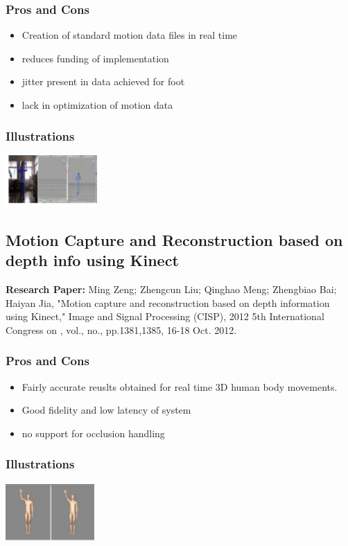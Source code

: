 \documentclass[a4paper,10pt]{report}
\begin{document}
\subsubsection{Pros and Cons}
\begin{itemize}
 \item Creation of standard motion data files in real time
 \item reduces funding of implementation
 \item jitter present in data achieved for foot
 \item lack in optimization of motion data
\end{itemize}
\subsubsection{Illustrations}\newline\newline
\includegraphics{./tech2.png}
\newline\newline


\subsection{Motion Capture and Reconstruction based on depth info using Kinect}
\textbf{Research Paper:} Ming Zeng; Zhengcun Liu; Qinghao Meng; Zhengbiao Bai; Haiyan Jia, "Motion capture and reconstruction based on depth information using Kinect," Image and Signal Processing (CISP), 2012 5th International Congress on , vol., no., pp.1381,1385, 16-18 Oct. 2012.
\subsubsection{Pros and Cons}
\begin{itemize}
 \item Fairly accurate reuslts obtained for real time 3D human body movements.
 \item Good fidelity and low latency of system
 \item no support for occlusion handling
\end{itemize}
\subsubsection{Illustrations}\newline\newline
\includegraphics{./tech3.png}
\newline\newline
\end{document}
